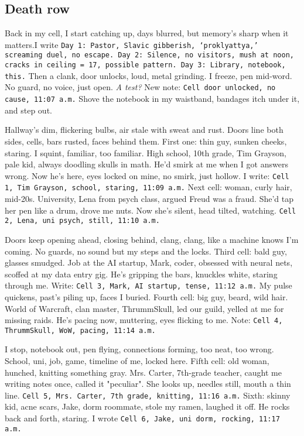 \documentclass[12pt,oneside]{book} %
\newcommand{\note}[1]{\texttt{#1}}
\begin{document}
\subsection*{Death row}
Back in my cell, I start catching up, days blurred, but memory’s sharp when it matters.I write \note{Day 1: Pastor, Slavic gibberish, ‘proklyattya,’ screaming duel, no escape. Day 2: Silence, no visitors, mush at noon, cracks in ceiling = 17, possible pattern. Day 3: Library, notebook, this.} Then a clank, door unlocks, loud, metal grinding. I freeze, pen mid-word. No guard, no voice, just open. \textit{A test?} New note: \note{Cell door unlocked, no cause, 11:07 a.m.} Shove the notebook in my waistband, bandages itch under it, and step out.

Hallway’s dim, flickering bulbs, air stale with sweat and rust. Doors line both sides, cells, bars rusted, faces behind them. First one: thin guy, sunken cheeks, staring. I squint, familiar, too familiar. High school, 10th grade, Tim Grayson, pale kid, always doodling skulls in math. He’d smirk at me when I got answers wrong. Now he’s here, eyes locked on mine, no smirk, just hollow. I write: \note{Cell 1, Tim Grayson, school, staring, 11:09 a.m.} Next cell: woman, curly hair, mid-20s. University, Lena from psych class, argued Freud was a fraud. She’d tap her pen like a drum, drove me nuts. Now she’s silent, head tilted, watching. \note{Cell 2, Lena, uni psych, still, 11:10 a.m.}

Doors keep opening ahead, closing behind, clang, clang, like a machine knows I’m coming. No guards, no sound but my steps and the locks. Third cell: bald guy, glasses smudged. Job at the AI startup, Mark, coder, obsessed with neural nets, scoffed at my data entry gig. He’s gripping the bars, knuckles white, staring through me. Write: \note{Cell 3, Mark, AI startup, tense, 11:12 a.m.} My pulse quickens, past’s piling up, faces I buried. Fourth cell: big guy, beard, wild hair. World of Warcraft, clan master, ThrummSkull, led our guild, yelled at me for missing raids. He’s pacing now, muttering, eyes flicking to me. Note: \note{Cell 4, ThrummSkull, WoW, pacing, 11:14 a.m.}

I stop, notebook out, pen flying, connections forming, too neat, too wrong. School, uni, job, game, timeline of me, locked here. Fifth cell: old woman, hunched, knitting something gray. Mrs. Carter, 7th-grade teacher, caught me writing notes once, called it "peculiar". She looks up, needles still, mouth a thin line. \note{Cell 5, Mrs. Carter, 7th grade, knitting, 11:16 a.m.} Sixth: skinny kid, acne scars, Jake, dorm roommate, stole my ramen, laughed it off. He rocks back and forth, staring. I wrote \note{Cell 6, Jake, uni dorm, rocking, 11:17 a.m.}
\end{document}
